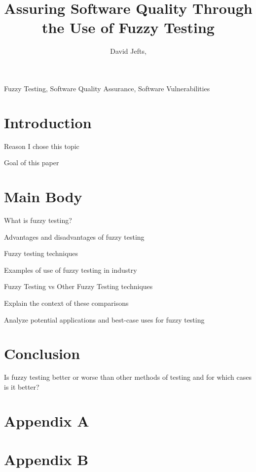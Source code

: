 \documentclass[10pt, compsoc]{IEEEtran}
\begin{document}
\title{Assuring Software Quality Through the Use of Fuzzy Testing}
\author{David Jefts, }

\maketitle


\begin{IEEEkeywords}
	Fuzzy Testing, Software Quality Assurance, Software Vulnerabilities
\end{IEEEkeywords}

\section{Introduction}
	Reason I chose this topic
	
	Goal of this paper


\section{Main Body}
	What is fuzzy testing?
	
	Advantages and disadvantages of fuzzy testing
	
	Fuzzy testing techniques
	
	Examples of use of fuzzy testing in industry
	
	Fuzzy Testing vs Other Fuzzy Testing techniques
	
	\indent\indent Explain the context of these comparisons
		
	Analyze potential applications and best-case uses for fuzzy testing


\section{Conclusion}
	Is fuzzy testing better or worse than other methods of testing and for which cases is it better?

\pagebreak
	
\appendix
	\section{Appendix A}
	
	\section{Appendix B}
	
\newpage
\nocite{*}


\end{document}
